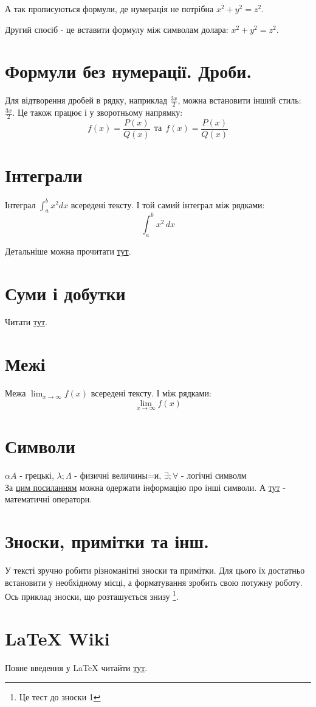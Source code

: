 А так прописуються формули, де нумерація не потрібна \(x^2 + y^2 = z^2\).

Другий спосіб - це вставити формулу між символам долара: $x^2 + y^2 = z^2$. 

\section{Формули без нумерації. Дроби.}
Для відтворення дробей в рядку, наприклад \(\frac{3x}{2}\), можна встановити інший стиль:
    \( \displaystyle \frac{3x}{2} \).
Це також працює і у зворотньому напрямку:
    \[ f(x)=\frac{P(x)}{Q(x)} \ \ \textrm{та}
    \ \ f(x)=\textstyle\frac{P(x)}{Q(x)} \]

\section{Інтеграли}
Інтеграл \(\int_{a}^{b} x^2 dx\) всередені тексту.
    \medskip
І той самий інтеграл між рядками:
    \[
    \int_{a}^{b} x^2 \,dx
    \]
    
Детальніше можна прочитати 
\href{https://www.overleaf.com/learn/latex/Integrals,_sums_and_limits#Integrals}{тут}.

\section{Суми і добутки}
Читати 
\href{https://www.overleaf.com/learn/latex/Integrals,_sums_and_limits#Sums_and_products}{тут}.

\section{Межі}
    
    Межа \(\lim_{x\to\infty} f(x)\) всередені тексту.
    І між рядками:
    \[
    \lim_{x\to\infty} f(x)
    \]

\section{Символи}
$\alpha A$ - грецькі,  $ \lambda; \Lambda$ - физичні величины=и, $\exists; \forall$ - логічні символм\\
За \href{https://www.overleaf.com/learn/latex/List_of_Greek_letters_and_math_symbols}{цим посиланням} можна одержати інформацію про інші символи. 
А \href{https://www.overleaf.com/learn/latex/Operators}{тут} - математичні оператори.

\section{Зноски, примітки та інш.}
У тексті зручно робити різноманітні зноски та примітки. Для цього їх достатньо встановити у необхідному місці, а форматування зробить свою потужну роботу. Ось приклад зноски, що розташується знизу \footnote{Це тест до зноски 1}. 

\section{LaTeX Wiki}
 Повне введення у LaTeX читайти \href{https://www.texlive.info/CTAN/info/lshort/russian/lshortru.pdf}{тут}.




